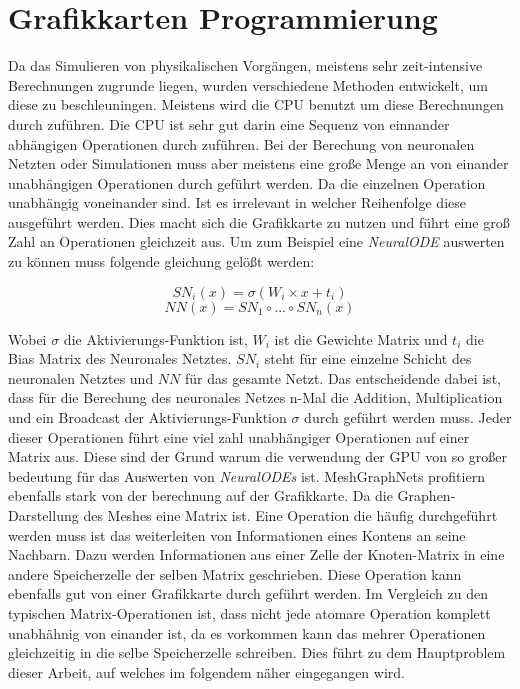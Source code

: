 
\section{Grafikkarten Programmierung} \label{sec:gpu}

Da das Simulieren von physikalischen Vorgängen, 
meistens sehr zeit-intensive Berechnungen zugrunde liegen, 
wurden verschiedene Methoden entwickelt, 
um diese zu beschleuningen.
Meistens wird die CPU benutzt um diese Berechnungen durch zuführen.
Die CPU ist sehr gut darin eine Sequenz von einnander abhängigen Operationen durch zuführen.
Bei der Berechung von neuronalen Netzten oder Simulationen muss aber meistens eine große Menge 
an von einander unabhängigen Operationen durch geführt werden.
Da die einzelnen Operation unabhängig voneinander sind.
Ist es irrelevant in welcher Reihenfolge diese ausgeführt werden.
Dies macht sich die Grafikkarte zu nutzen und führt eine groß Zahl an Operationen gleichzeit aus.
Um zum Beispiel eine \textit{NeuralODE} auswerten zu können muss folgende gleichung gelößt werden:

$$
SN_i(x) = \sigma ( W_i \times x + t_i )
$$
$$
NN(x) = SN_1 \circ ... \circ SN_n (x)
$$

Wobei $\sigma$ die Aktivierungs-Funktion ist, $W_i$ ist die Gewichte Matrix und $t_i$ die Bias Matrix des Neuronales Netztes.
$SN_i$ steht für eine einzelne Schicht des neuronalen Netztes und $NN$ für das gesamte Netzt.
Das entscheidende dabei ist, dass für die Berechung des neuronales Netzes n-Mal die Addition, Multiplication und ein Broadcast der Aktivierungs-Funktion
$\sigma$ durch geführt werden muss.
Jeder dieser Operationen führt eine viel zahl unabhängiger Operationen auf einer Matrix aus.
Diese sind der Grund warum die verwendung der GPU von so großer bedeutung für das Auswerten von \textit{NeuralODEs} ist.
MeshGraphNets profitiern ebenfalls stark von der berechnung auf der Grafikkarte.
Da die Graphen-Darstellung des Meshes eine Matrix ist.
Eine Operation die häufig durchgeführt werden muss ist das weiterleiten von Informationen eines Kontens an seine Nachbarn.
Dazu werden Informationen aus einer Zelle der Knoten-Matrix in eine andere Speicherzelle der selben Matrix geschrieben.
Diese Operation kann ebenfalls gut von einer Grafikkarte durch geführt werden.
Im Vergleich zu den typischen Matrix-Operationen ist, dass nicht jede atomare Operation komplett unabhähnig von einander ist,
da es vorkommen kann das mehrer Operationen gleichzeitig in die selbe Speicherzelle schreiben.
Dies führt zu dem Hauptproblem dieser Arbeit, auf welches im folgendem näher eingegangen wird.










% 